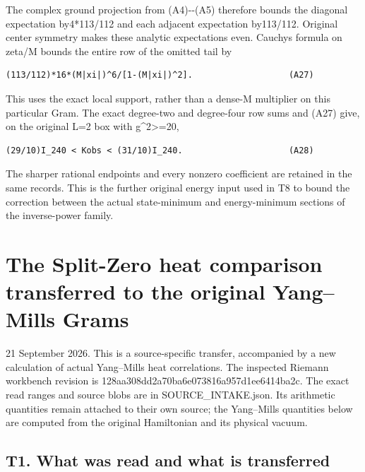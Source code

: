 \documentclass[11pt,a4paper]{article}
\let\originalsection\section
\renewcommand{\section}{\clearpage\originalsection}
\renewcommand{\[}{\begingroup\small\originaldisplaystart}
\renewcommand{\]}{\originaldisplayend\endgroup}
\begin{document}
The complex ground projection from (A4)-\/-(A5) therefore bounds the
diagonal expectation by4*113/112 and each adjacent expectation
by113/112. Original center symmetry makes these analytic expectations
even. Cauchy\textquotesingle s formula on \textbar zeta/M
bounds the entire row of the omitted tail by

\begin{verbatim}
(113/112)*16*(M|xi|)^6/[1-(M|xi|)^2].                   (A27)
\end{verbatim}

This uses the exact local support, rather than a dense-M multiplier on
this particular Gram. The exact degree-two and degree-four row sums and
(A27) give, on the original L=2 box with g\^{}2\textgreater=20,

\begin{verbatim}
(29/10)I_240 < Kobs < (31/10)I_240.                     (A28)
\end{verbatim}

The sharper rational endpoints and every nonzero coefficient are
retained in the same records. This is the further original energy input
used in T8 to bound the correction between the actual state-minimum and
energy-minimum sections of the inverse-power family.

\section{The Split-Zero heat comparison transferred to the original
Yang--Mills
Grams}\label{the-split-zero-heat-comparison-transferred-to-the-original-yangmills-grams}

21 September 2026. This is a source-specific transfer, accompanied by a
new calculation of actual Yang--Mills heat correlations. The inspected
Riemann workbench revision is 128aa308dd2a70ba6e073816a957d1ee6414ba2c.
The exact read ranges and source blobs are in
{S\allowbreak{}O\allowbreak{}U\allowbreak{}R\allowbreak{}C\allowbreak{}E\allowbreak{}\_\allowbreak{}I\allowbreak{}N\allowbreak{}T\allowbreak{}A\allowbreak{}K\allowbreak{}E\allowbreak{}.\allowbreak{}j\allowbreak{}s\allowbreak{}o\allowbreak{}n\allowbreak{}.\allowbreak{}}
Its arithmetic quantities remain attached to their own source; the
Yang--Mills quantities below are computed from the original Hamiltonian
and its physical vacuum.

\subsection{T1. What was read and what is
transferred}\label{t1.-what-was-read-and-what-is-transferred}
\end{document}
